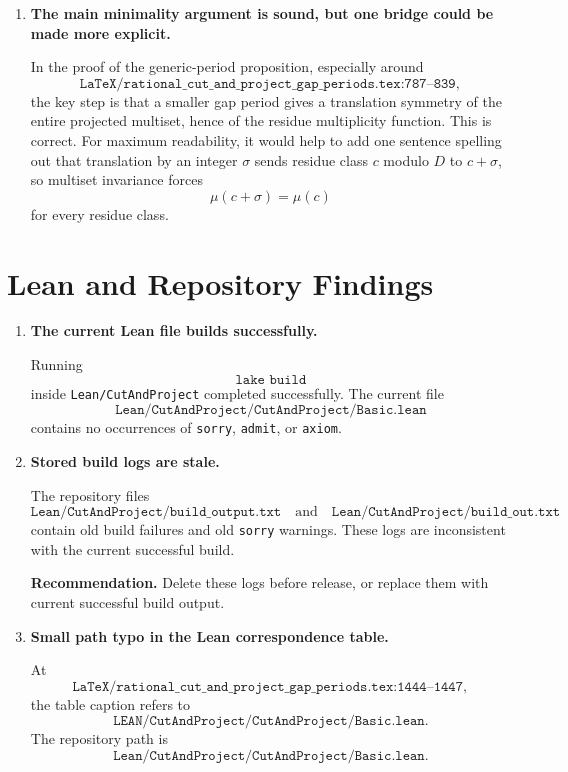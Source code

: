 \documentclass[11pt]{article}
\begin{document}
\begin{enumerate}[label=\textbf{M\arabic*.},leftmargin=*]
\item \textbf{The main minimality argument is sound, but one bridge could be
made more explicit.}

In the proof of the generic-period proposition, especially around
\[
\texttt{LaTeX/rational\_cut\_and\_project\_gap\_periods.tex:787--839},
\]
the key step is that a smaller gap period gives a translation symmetry of
the entire projected multiset, hence of the residue multiplicity function.
This is correct.  For maximum readability, it would help to add one sentence
spelling out that translation by an integer \(\sigma\) sends residue class
\(c\) modulo \(D\) to \(c+\sigma\), so multiset invariance forces
\[
  \mu(c+\sigma)=\mu(c)
\]
for every residue class.

\end{enumerate}

\section*{Lean and Repository Findings}

\begin{enumerate}[label=\textbf{L\arabic*.},leftmargin=*]

\item \textbf{The current Lean file builds successfully.}

Running
\[
\texttt{lake build}
\]
inside \texttt{Lean/CutAndProject} completed successfully.  The current file
\[
\texttt{Lean/CutAndProject/CutAndProject/Basic.lean}
\]
contains no occurrences of \texttt{sorry}, \texttt{admit}, or \texttt{axiom}.

\item \textbf{Stored build logs are stale.}

The repository files
\[
\texttt{Lean/CutAndProject/build\_output.txt}
\quad\text{and}\quad
\texttt{Lean/CutAndProject/build\_out.txt}
\]
contain old build failures and old \texttt{sorry} warnings.  These logs are
inconsistent with the current successful build.

\textbf{Recommendation.}  Delete these logs before release, or replace them
with current successful build output.

\item \textbf{Small path typo in the Lean correspondence table.}

At
\[
\texttt{LaTeX/rational\_cut\_and\_project\_gap\_periods.tex:1444--1447},
\]
the table caption refers to
\[
\texttt{LEAN/CutAndProject/CutAndProject/Basic.lean}.
\]
The repository path is
\[
\texttt{Lean/CutAndProject/CutAndProject/Basic.lean}.
\]

\end{enumerate}
\end{document}
